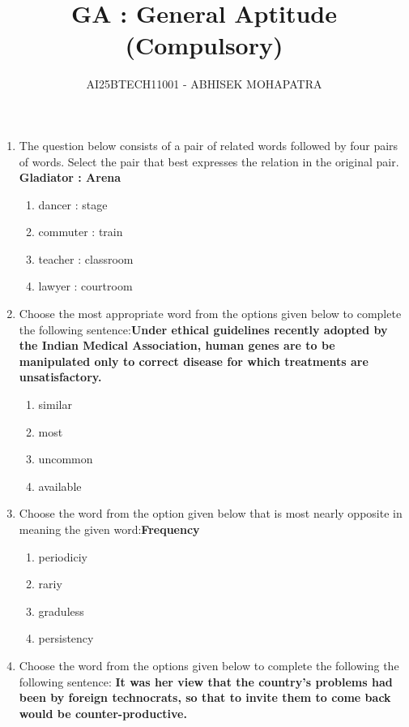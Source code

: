 \documentclass[journal]{IEEEtran}
\title{\textbf{GA : General Aptitude (Compulsory)}}
\author{AI25BTECH11001 - ABHISEK MOHAPATRA}
\begin{document}
\maketitle
\begin{enumerate}
	\item{ The question below consists of a pair of related words followed by four pairs of words. Select the pair that best expresses the relation in the original pair.}
		\newline \textbf{Gladiator : Arena}
\begin{enumerate}
\item {dancer : stage}
\item {commuter : train}
\item {teacher : classroom}
\item {lawyer : courtroom}
\end{enumerate}


\item {Choose the most appropriate word from the options given below to complete the following sentence:\newline\textbf{Under ethical guidelines recently adopted by the Indian Medical Association, human genes are to be manipulated only to correct disease for which \underline{\hspace{2cm}}treatments are unsatisfactory.}}	
	\begin{enumerate}
	\item {similar}
	\item {most}
	\item {uncommon}
	\item {available}
	\end{enumerate}

\item{Choose the word from the option given below that is most nearly opposite in meaning the given word:\newline\textbf{Frequency}}

	\begin{enumerate}
	\item {periodiciy}
	\item {rariy}
	\item {graduless}
	\item {persistency}
	\end{enumerate}
	\item {Choose the word from the options given below to complete the following the following sentence:
	\newline\textbf{It was her view that the country's problems had been \underline{\hspace{2cm}}by foreign technocrats, so that to invite them to come back would be counter-productive.}}
		\begin{enumerate}


\end{enumerate}
\end{enumerate}
\end{document}
